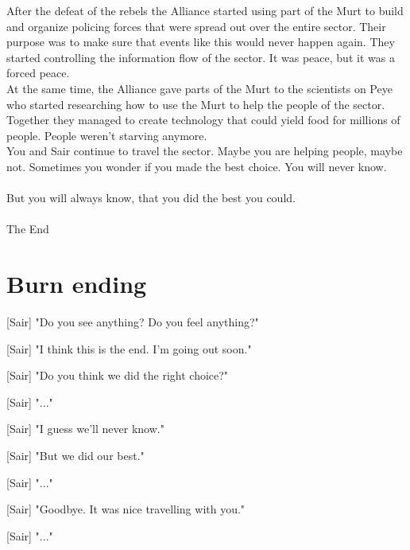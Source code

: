\documentclass[a4paper,12pt]{article}
\begin{document}
After the defeat of the rebels the Alliance started using part of the Murt to build and organize policing forces that were
spread out over the entire sector. Their purpose was to make sure that events like this would never happen again. 
They started controlling the information flow of the sector. It was peace, but it was a forced peace.\\

At the same time, the Alliance gave parts of the Murt to the scientists on Peye who started researching how to use the Murt
to help the people of the sector. Together they managed to create
technology that could yield food for millions of people. People weren't starving anymore.\\

You and Sair continue to travel the sector. Maybe you are helping people, maybe not.
Sometimes you wonder if you made the best choice. You will never know.\\\\
But you will always know, that you did the best you could.\\\\
The End

\section{Burn ending}

[Sair] "Do you see anything? Do you feel anything?"

[Sair] "I think this is the end. I'm going out soon."

[Sair] "Do you think we did the right choice?"

[Sair] "..."

[Sair] "I guess we'll never know."

[Sair] "But we did our best."

[Sair] "..."

[Sair] "Goodbye. It was nice travelling with you."

[Sair] "..."
\end{document}
